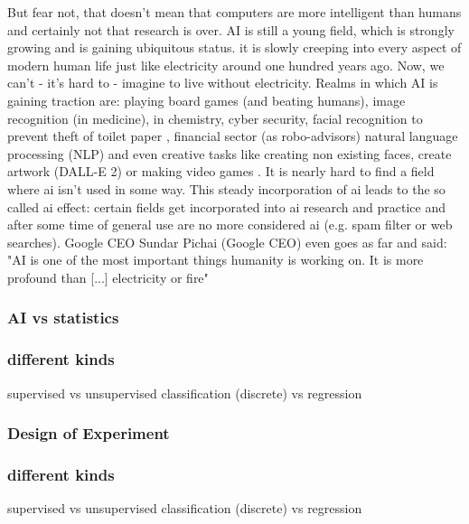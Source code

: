 But fear not, that doesn't mean that computers are more intelligent than humans and certainly not that research is over. 
AI is still a young field, which is strongly growing and is gaining ubiquitous status. 
it is slowly creeping into every aspect of modern human life just like electricity around one hundred years ago. 
Now, we can't - it's hard to - imagine to live without electricity. 
Realms in which AI is gaining traction are: 
%
playing board games (and beating humans)\cite{Silver2017}, 
image recognition (in medicine)\cite{Li2020,Deo2015,Topol2019,Fujiyoshi2019}, 
in chemistry\cite{Westermayr2019,goh2017chemception,jha2018elemnet}, 
cyber security\cite{Sarker2021},
facial recognition to prevent theft of toilet paper \cite{Andrews2017},
financial sector (as robo-advisors)\cite{Littman2021}
natural language processing (NLP)\cite{Koroteev2021,Liu2021gpt,Parviainen2021}
and even creative tasks like 
creating non existing faces\cite{Mansourifar2020}, 
create artwork (DALL-E 2)\cite{Marcus2022} or 
making video games \cite{Guzdial2016}
.
It is nearly hard to find a field where \gls{ai} isn't used in some way. 
This steady incorporation of \gls{ai} leads to the so called \gls{ai} effect\cite{McCorduck1982,ai100}: 
certain fields get incorporated into \gls{ai} research and practice and after some time of general use are no more considered \gls{ai} (e.g. spam filter or web searches).
Google CEO Sundar Pichai (Google CEO) even goes as far and said: 
"AI is one of the most important things humanity is working on. It is more profound than [...] electricity or fire"\cite{Hassan2020}

%

\subsubsection{AI vs statistics}
\subsubsection{different kinds} 
supervised vs unsupervised
classification (discrete) vs regression
\subsubsection{Design of Experiment}

\subsubsection{different kinds} 
supervised vs unsupervised
classification (discrete) vs regression
%
